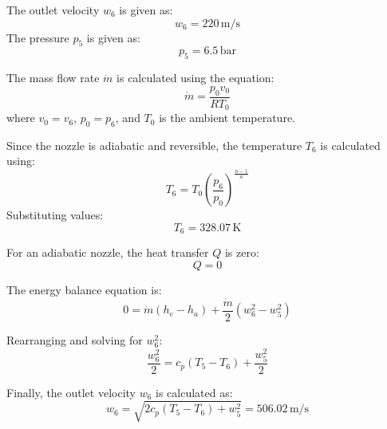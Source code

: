 The outlet velocity \( w_6 \) is given as:  
\[
w_6 = 220 \, \text{m/s}
\]  
The pressure \( p_5 \) is given as:  
\[
p_5 = 6.5 \, \text{bar}
\]  

The mass flow rate \( \dot{m} \) is calculated using the equation:  
\[
\dot{m} = \frac{p_0 v_0}{R T_0}
\]  
where \( v_0 = v_6 \), \( p_0 = p_6 \), and \( T_0 \) is the ambient temperature.  

Since the nozzle is adiabatic and reversible, the temperature \( T_6 \) is calculated using:  
\[
T_6 = T_0 \left( \frac{p_6}{p_0} \right)^{\frac{n-1}{n}}
\]  
Substituting values:  
\[
T_6 = 328.07 \, \text{K}
\]  

For an adiabatic nozzle, the heat transfer \( Q \) is zero:  
\[
Q = 0
\]  

The energy balance equation is:  
\[
0 = \dot{m} (h_e - h_a) + \frac{\dot{m}}{2} (w_6^2 - w_5^2)
\]  

Rearranging and solving for \( w_6^2 \):  
\[
\frac{w_6^2}{2} = c_p (T_5 - T_6) + \frac{w_5^2}{2}
\]  

Finally, the outlet velocity \( w_6 \) is calculated as:  
\[
w_6 = \sqrt{2 c_p (T_5 - T_6) + w_5^2} = 506.02 \, \text{m/s}
\]